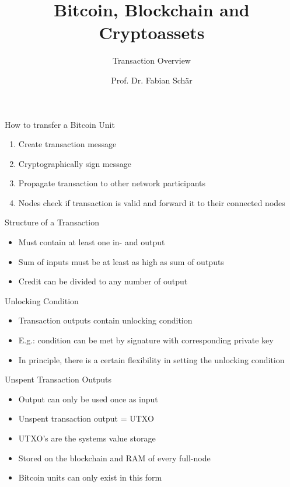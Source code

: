 \documentclass[]{beamer}
\title{Bitcoin, Blockchain and Cryptoassets}
\subtitle{Transaction Overview}
\author{Prof. Dr. Fabian Schär}
\institute{University of Basel}
\begin{document}
\thispagestyle{empty}
\begin{frame}[noframenumbering]
	\titlepage
\end{frame}


\begin{frame}{How to transfer a Bitcoin Unit} %

\begin{enumerate}
		\item<1->{Create transaction message}
		\item<2->{Cryptographically sign message}
		\item<3->{Propagate transaction to other network participants}
		\item<4->{Nodes check if transaction is valid and forward it to their connected nodes}
	\end{enumerate}	
\end{frame}


\begin{frame}{Structure of a Transaction}
	\centering
	\begin{figure}
	
	\end{figure} 
\vspace{1em}
\begin{itemize}
  	\item<2->{Must contain at least one in- and output}
  	\item<3->{Sum of inputs must be at least as high as sum of outputs}
	\item<4->{Credit can be divided to any number of output}
\end{itemize}
\end{frame}	


\begin{frame}{Unlocking Condition}
\begin{itemize}
    \item<1->{Transaction outputs contain unlocking condition}
    \item<2->{E.g.: condition can be met by signature with corresponding private key}
    \item<3->{In principle, there is a certain flexibility in setting the unlocking condition}
    
\end{itemize}
\end{frame}        


\begin{frame}{Unspent Transaction Outputs}
\begin{itemize}
    \item<1->{Output can only be used once as input}
    \item<2->{Unspent transaction output = UTXO}
    \item<3->{UTXO's are the systems value storage}
    \item<4->{Stored on the blockchain and RAM of every full-node}
    \item<5->{Bitcoin units can only exist in this form}
\end{itemize}    
\end{frame}
\end{document}
